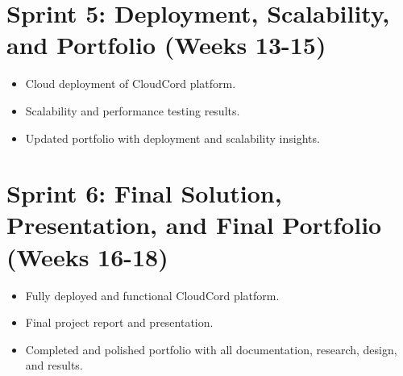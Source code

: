 \documentclass[12pt]{report}
\begin{document}
\section*{Sprint 5: Deployment, Scalability, and Portfolio (Weeks 13-15)}
\begin{itemize}
    \item Cloud deployment of CloudCord platform.
    \item Scalability and performance testing results.
    \item Updated portfolio with deployment and scalability insights.
\end{itemize}

\section*{Sprint 6: Final Solution, Presentation, and Final Portfolio (Weeks 16-18)}
\begin{itemize}
    \item Fully deployed and functional CloudCord platform.
    \item Final project report and presentation.
    \item Completed and polished portfolio with all documentation, research, design, and results.
\end{itemize}
\end{document}
